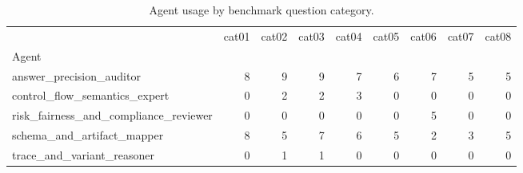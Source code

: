 \begin{table}
\caption{Agent usage by benchmark question category.}
\label{tab:agent-usage-by-category}
\begin{tabular}{lrrrrrrrr}
\toprule
 & cat01 & cat02 & cat03 & cat04 & cat05 & cat06 & cat07 & cat08 \\
Agent &  &  &  &  &  &  &  &  \\
\midrule
answer\_precision\_auditor & 8 & 9 & 9 & 7 & 6 & 7 & 5 & 5 \\
control\_flow\_semantics\_expert & 0 & 2 & 2 & 3 & 0 & 0 & 0 & 0 \\
risk\_fairness\_and\_compliance\_reviewer & 0 & 0 & 0 & 0 & 0 & 5 & 0 & 0 \\
schema\_and\_artifact\_mapper & 8 & 5 & 7 & 6 & 5 & 2 & 3 & 5 \\
trace\_and\_variant\_reasoner & 0 & 1 & 1 & 0 & 0 & 0 & 0 & 0 \\
\bottomrule
\end{tabular}
\end{table}
